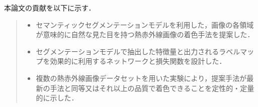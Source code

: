 \documentclass[11pt,dvipdfmx]{ujreport}
\begin{document}
\newpage
本論文の貢献を以下に示す．\par
\begin{quote}
    \begin{itemize}
        \item セマンティックセグメンテーションモデルを利用した，画像の各領域が意味的に自然な見た目を持つ熱赤外線画像の着色手法を提案した．
        \item セグメンテーションモデルで抽出した特徴量と出力されるラベルマップを効果的に利用するネットワークと損失関数を設計した．
        \item 複数の熱赤外線画像データセットを用いた実験により，提案手法が最新の手法と同等又はそれ以上の品質で着色できることを定性的・定量的に示した．
    \end{itemize}
\end{quote}
\end{document}
